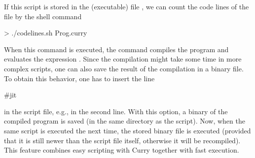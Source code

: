 \begin{itemize}
%
If this script is stored in the (executable) file ,
we can count the code lines of the file  by
the shell command
\begin{curry}
> ./codelines.sh Prog.curry
\end{curry}
%
When this command is executed, the command 
compiles the program and evaluates the expression .
Since the compilation might take some time in more complex scripts,
one can also save the result of the compilation in a binary file.
To obtain this behavior, one has to insert the line
\begin{curry}
#jit
\end{curry}
in the script file, e.g., in the second line.
With this option, a binary of the compiled program is saved
(in the same directory as the script).
Now, when the same script is executed the next time,
the stored binary file is executed (provided that it is still newer
than the script file itself, otherwise it will be recompiled).
This feature combines easy scripting with Curry together with
fast execution.
\end{itemize}

